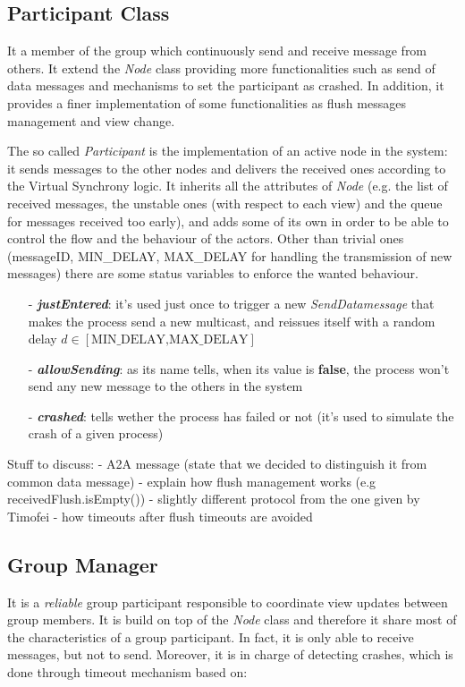 \documentclass[11pt]{article}
\begin{document}
	\subsection{Participant Class}
	It a member of the group which continuously send and receive message from others. It extend the \textit{Node} class providing more functionalities such as send of data messages and mechanisms to set the participant as crashed. In addition, it provides a finer implementation of some functionalities as flush messages management and view change.
	
	The so called \textit{Participant} is the implementation of an active node in the system: it sends messages to the other nodes and delivers the received ones according to the Virtual Synchrony logic.\newline
	It inherits all the attributes of \textit{Node} (e.g. the list of received messages, the unstable ones (with respect to each view) and the queue for messages received too early), and adds some of its own in order to be able to control the flow and the behaviour of the actors. Other than trivial ones (messageID, MIN\_DELAY, MAX\_DELAY for handling the transmission of new messages) there are some status variables to enforce the wanted behaviour. 
	\begin{itemize}
		\item [-] \textit{\textbf{justEntered}}: it's used just once to trigger a new \textit{SendDatamessage} that makes the process send a new multicast, and reissues itself with a random delay $d \in [\text{MIN\_DELAY,MAX\_DELAY}]$
		\item [-] \textit{\textbf{allowSending}}: as its name tells, when its value is \textbf{false}, the process won't send any new message to the others in the system
		\item [-] \textit{\textbf{crashed}}: tells wether the process has failed or not (it's used to simulate the crash of a given process)
	\end{itemize}
	
		
	Stuff to discuss:
	- A2A message (state that we decided to distinguish it from common data message)
	- explain how flush management works (e.g receivedFlush.isEmpty())
	- slightly different protocol from the one given by Timofei
	- how timeouts after flush timeouts are avoided
		
	\subsection{Group Manager}
	It is a \textit{reliable} group participant responsible to coordinate view updates between group members. It is build on top of the \textit{Node} class and therefore it share most of the characteristics of a group participant. In fact, it is only able to receive messages, but not to send. Moreover, it is in charge of detecting crashes, which is done through timeout mechanism based on:
	
\end{document}
